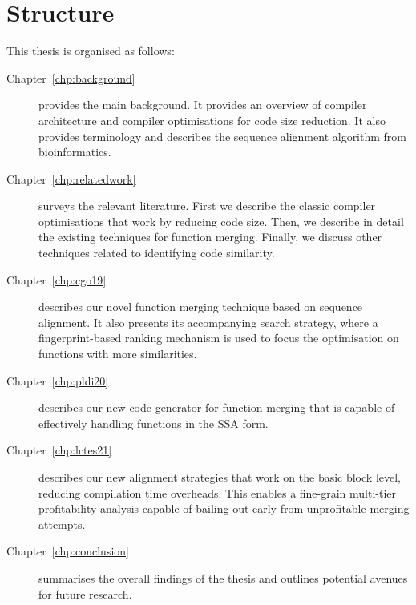 \section{Structure}

This thesis is organised as follows:
\begin{description}

\item[Chapter~\ref{chp:background}] provides the main background. It provides an overview of compiler architecture and compiler optimisations for code size reduction.
It also provides terminology and describes the sequence alignment algorithm from bioinformatics.

\item[Chapter~\ref{chp:relatedwork}] surveys the relevant literature. First we describe the classic compiler optimisations that work by reducing code size. Then, we describe in detail the existing techniques for function merging. Finally, we discuss other techniques related to identifying code similarity.

\item[Chapter~\ref{chp:cgo19}] describes our novel function merging technique based on sequence alignment.
It also presents its accompanying search strategy, where a fingerprint-based ranking mechanism is used to focus the optimisation on functions with more similarities.

\item[Chapter~\ref{chp:pldi20}] describes our new code generator for function merging that is capable of effectively handling functions in the SSA form.

\item[Chapter~\ref{chp:lctes21}] describes our new alignment strategies that work on the basic block level, reducing compilation time overheads.
This enables a fine-grain multi-tier profitability analysis capable of bailing out early from unprofitable merging attempts.


\item[Chapter~\ref{chp:conclusion}] summarises the overall findings of the thesis and outlines potential avenues for future research.

\end{description}
